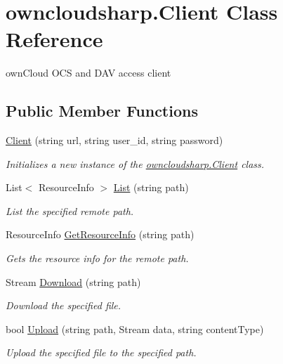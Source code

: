 \hypertarget{classowncloudsharp_1_1_client}{}\section{owncloudsharp.\+Client Class Reference}
\label{classowncloudsharp_1_1_client}


own\+Cloud O\+C\+S and D\+A\+V access client  


\subsection*{Public Member Functions}
\begin{DoxyCompactItemize}
\item 
\hyperlink{classowncloudsharp_1_1_client_a67d23283e5c2cfb84a2c170888992f19}{Client} (string url, string user\+\_\+id, string password)
\begin{DoxyCompactList}\small\item\em Initializes a new instance of the \hyperlink{classowncloudsharp_1_1_client}{owncloudsharp.\+Client} class. \end{DoxyCompactList}\item 
List$<$ Resource\+Info $>$ \hyperlink{classowncloudsharp_1_1_client_a914c144ebbe207958829523f7eda3609}{List} (string path)
\begin{DoxyCompactList}\small\item\em List the specified remote path. \end{DoxyCompactList}\item 
Resource\+Info \hyperlink{classowncloudsharp_1_1_client_aa482194c404ccba36a4095b513c4cf7a}{Get\+Resource\+Info} (string path)
\begin{DoxyCompactList}\small\item\em Gets the resource info for the remote path. \end{DoxyCompactList}\item 
Stream \hyperlink{classowncloudsharp_1_1_client_a3a71b182537b36e924e7df1ae3bbac89}{Download} (string path)
\begin{DoxyCompactList}\small\item\em Download the specified file. \end{DoxyCompactList}\item 
bool \hyperlink{classowncloudsharp_1_1_client_a17ce25a3959149a647f91340be7b3f8d}{Upload} (string path, Stream data, string content\+Type)
\begin{DoxyCompactList}\small\item\em Upload the specified file to the specified path. \end{DoxyCompactList}\item 

\end{DoxyCompactItemize}
